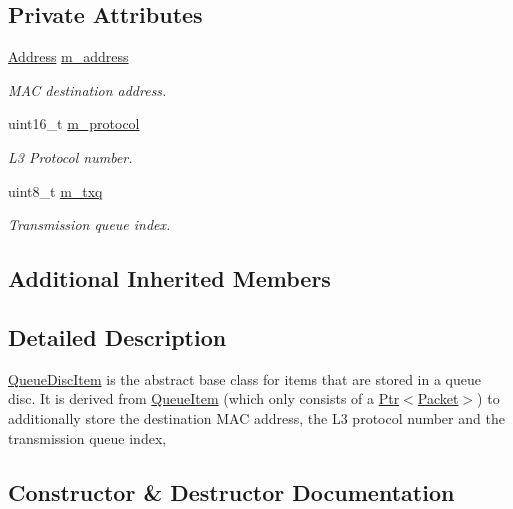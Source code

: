 \subsection*{Private Attributes}
\begin{DoxyCompactItemize}
\item 
\hyperlink{classns3_1_1Address}{Address} \hyperlink{classns3_1_1QueueDiscItem_a429aff942058a8f504346937e9cf06d4}{m\+\_\+address}
\begin{DoxyCompactList}\small\item\em M\+AC destination address. \end{DoxyCompactList}\item 
uint16\+\_\+t \hyperlink{classns3_1_1QueueDiscItem_a4c4393e03f5a0d0d65f603f6c9347c4c}{m\+\_\+protocol}
\begin{DoxyCompactList}\small\item\em L3 Protocol number. \end{DoxyCompactList}\item 
uint8\+\_\+t \hyperlink{classns3_1_1QueueDiscItem_a109c7b6161c715175d5c7f7b6e423aa4}{m\+\_\+txq}
\begin{DoxyCompactList}\small\item\em Transmission queue index. \end{DoxyCompactList}\end{DoxyCompactItemize}
\subsection*{Additional Inherited Members}


\subsection{Detailed Description}
\hyperlink{classns3_1_1QueueDiscItem}{Queue\+Disc\+Item} is the abstract base class for items that are stored in a queue disc. It is derived from \hyperlink{classns3_1_1QueueItem}{Queue\+Item} (which only consists of a \hyperlink{classns3_1_1Ptr}{Ptr$<$\+Packet$>$}) to additionally store the destination M\+AC address, the L3 protocol number and the transmission queue index, 

\subsection{Constructor \& Destructor Documentation}
